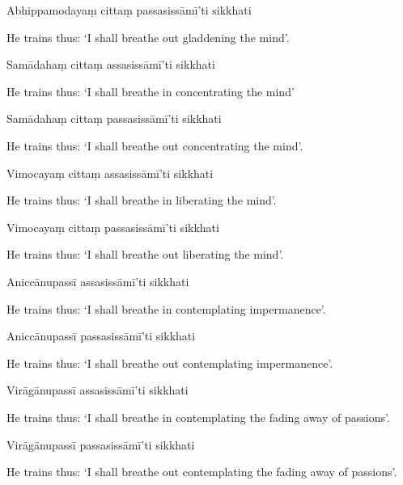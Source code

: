 Abhippamodayaṃ cittaṃ passasissāmī'ti sikkhati

\begin{english}
  He trains thus: `I shall breathe out gladdening the mind'.
\end{english}

Samādahaṃ cittaṃ assasissāmī'ti sikkhati

\begin{english}
  He trains thus: `I shall breathe in concentrating the mind'
\end{english}

Samādahaṃ cittaṃ passasissāmī'ti sikkhati

\begin{english}
  He trains thus: `I shall breathe out concentrating the mind'.
\end{english}

Vimocayaṃ cittaṃ assasissāmī'ti sikkhati

\begin{english}
  He trains thus: `I shall breathe in liberating the mind'.
\end{english}

Vimocayaṃ cittaṃ passasissāmī'ti sikkhati

\begin{english}
  He trains thus: `I shall breathe out liberating the mind'.
\end{english}

Aniccānupassī assasissāmī'ti sikkhati

\begin{english}
  He trains thus: `I shall breathe in contemplating impermanence'.
\end{english}

Aniccānupassī passasissāmī'ti sikkhati

\begin{english}
  He trains thus: `I shall breathe out contemplating impermanence'.
\end{english}

Virāgānupassī assasissāmī'ti sikkhati

\begin{english}
  He trains thus: `I shall breathe in contemplating the fading away of passions'.
\end{english}

Virāgānupassī passasissāmī'ti sikkhati

\begin{english}
  He trains thus: `I shall breathe out contemplating the fading away of passions'.
\end{english}

